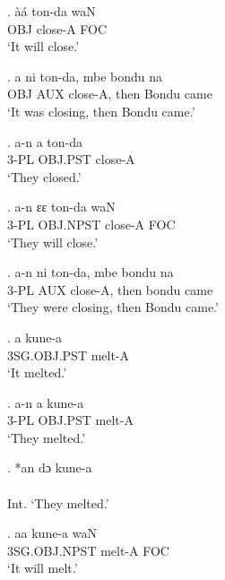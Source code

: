 \documentclass{assets/fieldnotes}
\begin{document}
\exg.
àá             ton-da    waN \\
OBJ   close-A   FOC \\%
`It will close.'

\exg.
a         ni    ton-da,    mbe    bondu   na   \\
OBJ   AUX   close-A,   then   Bondu   came \\%
`It was closing, then Bondu came.'

\exg.
a-n    a         ton-da  \\
3-PL   OBJ.PST   close-A \\%
`They closed.'

\exg.
a-n    ɛɛ         ton-da    waN \\
3-PL   OBJ.NPST   close-A   FOC \\%
`They will close.' \label{26890}


\exg.
a-n    ni    ton-da,    mbe    bondu   na   \\
3-PL   AUX   close-A,   then   bondu   came \\%
`They were closing, then Bondu came.' \label{17800}


\exg.
a             kune-a \\
3SG.OBJ.PST   melt-A \\%
`It melted.'

\exg.
a-n    a         kune-a \\
3-PL   OBJ.PST   melt-A \\%
`They melted.'

\exg.
*an   dɔ   kune-a \\
{}    {}   {}     \\%
Int. `They melted.' \label{42408}


\exg.
aa             kune-a   waN \\
3SG.OBJ.NPST   melt-A   FOC \\%
`It will melt.'
\end{document}

